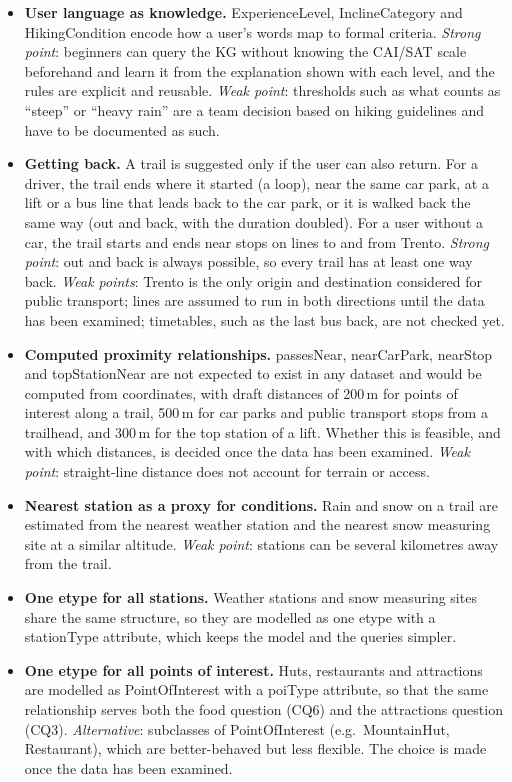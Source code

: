 \begin{itemize}
    \item \textbf{User language as knowledge.} ExperienceLevel, InclineCategory and HikingCondition encode how a user's words map to formal criteria. \emph{Strong point}: beginners can query the KG without knowing the CAI/SAT scale beforehand and learn it from the explanation shown with each level, and the rules are explicit and reusable. \emph{Weak point}: thresholds such as what counts as ``steep'' or ``heavy rain'' are a team decision based on hiking guidelines and have to be documented as such.
    \item \textbf{Getting back.} A trail is suggested only if the user can also return. For a driver, the trail ends where it started (a loop), near the same car park, at a lift or a bus line that leads back to the car park, or it is walked back the same way (out and back, with the duration doubled). For a user without a car, the trail starts and ends near stops on lines to and from Trento. \emph{Strong point}: out and back is always possible, so every trail has at least one way back. \emph{Weak points}: Trento is the only origin and destination considered for public transport; lines are assumed to run in both directions until the data has been examined; timetables, such as the last bus back, are not checked yet.
    \item \textbf{Computed proximity relationships.} passesNear, nearCarPark, nearStop and topStationNear are not expected to exist in any dataset and would be computed from coordinates, with draft distances of 200\,m for points of interest along a trail, 500\,m for car parks and public transport stops from a trailhead, and 300\,m for the top station of a lift. Whether this is feasible, and with which distances, is decided once the data has been examined. \emph{Weak point}: straight-line distance does not account for terrain or access.
    \item \textbf{Nearest station as a proxy for conditions.} Rain and snow on a trail are estimated from the nearest weather station and the nearest snow measuring site at a similar altitude. \emph{Weak point}: stations can be several kilometres away from the trail.
    \item \textbf{One etype for all stations.} Weather stations and snow measuring sites share the same structure, so they are modelled as one etype with a stationType attribute, which keeps the model and the queries simpler.
    \item \textbf{One etype for all points of interest.} Huts, restaurants and attractions are modelled as PointOfInterest with a poiType attribute, so that the same relationship serves both the food question (CQ6) and the attractions question (CQ3). \emph{Alternative}: subclasses of PointOfInterest (e.g.\ MountainHut, Restaurant), which are better-behaved but less flexible. The choice is made once the data has been examined.

\end{itemize}
